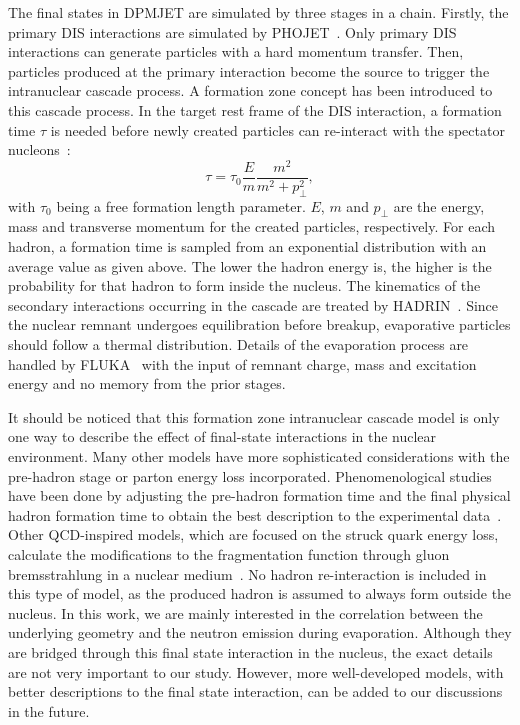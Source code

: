The final states in DPMJET are simulated by three stages in a chain. Firstly,
the primary DIS interactions are simulated by PHOJET~\cite{Engel:1995yda}. Only
primary DIS interactions can generate particles with a hard momentum transfer.
Then, particles produced at the primary interaction become the source to trigger the
intranuclear cascade process. A formation zone concept has been introduced to
this cascade process. In the target rest frame of the DIS interaction, a
formation time $\tau$ is needed before newly created particles can re-interact
with the spectator nucleons~\cite{Ferrari:1995cq}:
\begin{equation}
\tau = \tau_{0}\frac{E}{m}\frac{m^{2}}{m^{2}+p^{2}_{\perp}},
\end{equation}
with $\tau_{0}$ being a free formation length parameter. $E$, $m$ and
$p_{\perp}$ are the energy, mass and transverse momentum for the created
particles, respectively. For each hadron, a formation time is sampled from an
exponential distribution with an average value as given above. The lower the
hadron energy is, the higher is the probability for that hadron to form inside
the nucleus. The kinematics of the secondary interactions occurring in the
cascade are treated by HADRIN~\cite{Hanssgen:1986az}. Since the nuclear remnant
undergoes equilibration before breakup, evaporative particles should follow a
thermal distribution. Details of the evaporation process are handled by
FLUKA~\cite{Ferrari:2005zk} with the input of remnant charge, mass and
excitation energy and no memory from the prior stages.

It should be noticed that this formation zone intranuclear cascade model is only
one way to describe the effect of final-state interactions in the nuclear
environment. Many other models have more sophisticated considerations with the
pre-hadron stage or parton energy loss incorporated. Phenomenological studies
have been done by adjusting the pre-hadron formation time and the final physical
hadron formation time to obtain the best description to the experimental
data~\cite{Akopov:2004ap}. Other QCD-inspired models, which are focused on the
struck quark energy loss, calculate the modifications to the fragmentation
function through gluon bremsstrahlung in a nuclear
medium~\cite{Salgado:2003gb,Chang:2014fba}. No hadron re-interaction is included
in this type of model, as the produced hadron is assumed to always form outside
the nucleus. In this work, we are mainly interested in the correlation between
the underlying geometry and the neutron emission during evaporation. Although
they are bridged through this final state interaction in the nucleus, the exact
details are not very important to our study. However, more well-developed
models, with better descriptions to the final state interaction, can be added to
our discussions in the future.


